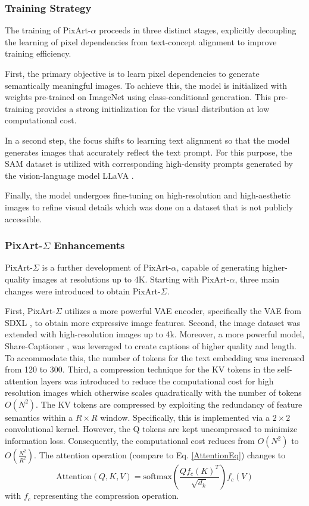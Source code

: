 \subsubsection{Training Strategy}
The training of PixArt-$\alpha$ proceeds in three distinct stages, explicitly decoupling the learning of pixel dependencies from text-concept alignment to improve training efficiency.

First, the primary objective is to learn pixel dependencies to generate semantically meaningful images. To achieve this, the model is initialized with weights pre-trained on ImageNet \cite{ImageNet} using class-conditional generation. This pre-training provides a strong initialization for the visual distribution at low computational cost.

 In a second step, the focus shifts to learning text alignment so that the model generates images that accurately reflect the text prompt. For this purpose, the SAM \cite{SAM} dataset is utilized with corresponding high-density prompts generated by the vision-language model LLaVA \cite{LLaVA}.
 
  Finally, the model undergoes fine-tuning on high-resolution and high-aesthetic images to refine visual details which was done on a dataset that is not publicly accessible.

\subsubsection{PixArt-$\Sigma$ Enhancements }
PixArt-$\Sigma$ is a further development of PixArt-$\alpha$, capable of generating higher-quality images at resolutions up to 4K. Starting with PixArt-$\alpha$, three main changes were introduced to obtain PixArt-$\Sigma$. 

First, PixArt-$\Sigma$ utilizes a more powerful VAE encoder, specifically the VAE from SDXL \cite{SDXL}, to obtain more expressive image features.  Second, the image dataset was extended with high-resolution images up to 4k. Moreover, a more powerful model, Share-Captioner \cite{chen2024sharegpt4v}, was leveraged to create captions of higher quality and length. To accommodate this, the number of tokens for the text embedding was increased from 120 to 300. 
Third, a compression technique for the KV tokens in the self-attention layers was introduced to reduce the computational cost for high resolution images which otherwise scales quadratically with the number of tokens $O(N^2)$. The KV tokens are compressed by exploiting the redundancy of feature semantics within a $R \times R$ window. Specifically, this is implemented via a $2 \times 2$ convolutional kernel. However, the Q tokens are kept uncompressed to minimize information loss. Consequently, the computational cost reduces from $O(N^2)$ to $O(\frac{N^2}{R^2})$. The attention operation (compare to Eq. \ref{AttentionEq}) changes to 
\begin{equation}
	\text{Attention}(Q,K,V) = \text{softmax}\left( \frac{Q f_c(K)^T}{\sqrt{d_k}}\right) f_c(V)
\end{equation} 
with $f_c$ representing the compression operation. 

